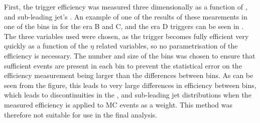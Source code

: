 First, the trigger efficiency was measured three dimensionally as a function of \METnoMU, \Mjj and sub-leading jet's \pt. An example of one of the results of these mearements in one of the bins in \METnoMU for the era B and C, and the era D triggers can be seen in . The three variables used were chosen, as the trigger becomes fully efficient very quickly as a function of the $\eta$ related variables, so no parametrisation of the efficiency is necessary. The number and size of the bins was chosen to ensure that sufficient events are present in each bin to prevent the statistical error on the efficiency measurement being larger than the differences between bins. As can be seen from the figure, this leads to very large differences in efficiency between bins, which leads to discontinuities in the \MET, \Mjj and sub-leading jet \pt distributions when the measured efficiency is applied to \ac{MC} events as a weight. This method was therefore not suitable for use in the final analysis.

